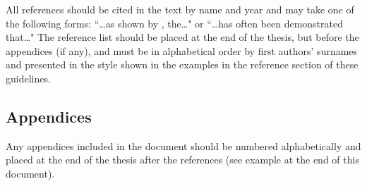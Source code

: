 All references should be cited in the text by name and year and may take one of the following forms: ``…as shown by \textcite{Tarbali2019}, the…" or ``…has often been demonstrated \parencite{Davalos2020b, Davalos2019, Aristeidou2024a} that…" The reference list should be placed at the end of the thesis, but before the appendices (if any), and must be in alphabetical order by first authors' surnames and presented in the style shown in the examples in the reference section of these guidelines.

\subsection{Appendices}

Any appendices included in the document should be numbered alphabetically and placed at the end of the thesis after the references (see example at the end of this document).
